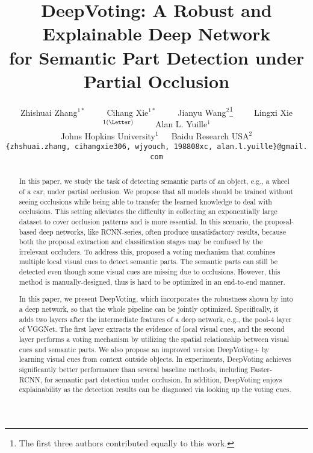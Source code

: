 \documentclass[10pt,twocolumn,letterpaper]{article}
\begin{document}
  \title{DeepVoting: A Robust and Explainable Deep Network \\ for Semantic Part Detection under Partial Occlusion}

  \author{Zhishuai Zhang$^{1*}$~~~~~Cihang Xie$^{1*}$~~~~~Jianyu Wang$^{2}$\thanks{The first three authors contributed equally to this work.}~~~~~Lingxi Xie$^{1(\textrm{\Letter})}$~~~~~Alan L. Yuille$^{1}$\\
  Johns Hopkins University$^{1}$~~~Baidu Research USA$^{2}$\\
  {\tt\small \{zhshuai.zhang,~cihangxie306,~wjyouch,~198808xc,~alan.l.yuille\}@gmail.com}\\
  }


  \maketitle
  \thispagestyle{empty}
  \begin{abstract}
  In this paper, we study the task of detecting semantic parts of an object, e.g., a wheel of a car, under partial occlusion. We propose that all models should be trained without seeing occlusions while being able to transfer the learned knowledge to deal with occlusions. This setting alleviates the difficulty in collecting an exponentially large dataset to cover occlusion patterns and is more essential. In this scenario, the proposal-based deep networks, like RCNN-series, often produce unsatisfactory results, because both the proposal extraction and classification stages may be confused by the irrelevant occluders. To address this, \cite{wang2017detecting} proposed a voting mechanism that combines multiple local visual cues to detect semantic parts. The semantic parts can still be detected even though some visual cues are missing due to occlusions. However, this method is manually-designed, thus is hard to be optimized in an end-to-end manner.

  In this paper, we present DeepVoting, which incorporates the robustness shown by \cite{wang2017detecting} into a deep network, so that the whole pipeline can be jointly optimized. Specifically, it adds two layers after the intermediate features of a deep network,  e.g., the pool-4 layer of VGGNet. The first layer extracts the evidence of local visual cues, and the second layer performs a voting mechanism by utilizing the spatial relationship between visual cues and semantic parts.
  We also propose an improved version DeepVoting+ by learning visual cues from context outside objects.
  In experiments, DeepVoting achieves significantly better performance than several baseline methods, including Faster-RCNN, for semantic part detection under occlusion. In addition, DeepVoting enjoys explainability as the detection results can be diagnosed via looking up the voting cues.
  \end{abstract}
\end{document}
